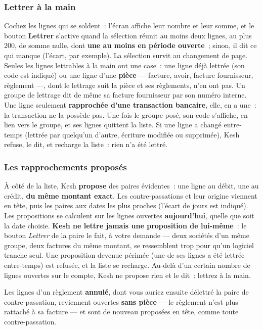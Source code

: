 \documentclass[a4paper,11pt,oneside]{article}
\begin{document}
\subsubsection{Lettrer à la main}

Cochez les lignes qui se soldent~: l'écran affiche leur nombre et leur somme, et le bouton
\textbf{Lettrer} s'active quand la sélection réunit au moins deux lignes, au plus 200, de somme
nulle, dont \textbf{une au moins en période ouverte}~; sinon, il dit ce qui manque (l'écart, par
exemple). La sélection survit au changement de page. Seules les lignes lettrables à la main
ont une case~: une ligne déjà lettrée (son code est indiqué) ou une ligne d'une
\textbf{pièce} --- facture, avoir, facture fournisseur, règlement ---, dont le lettrage suit la
pièce et ses règlements, n'en ont pas. Un groupe de lettrage dit de même sa facture fournisseur par son numéro interne. Une ligne seulement \textbf{rapprochée d'une transaction
bancaire}, elle, en a une~: la transaction ne la possède pas. Une fois le
groupe posé, son code s'affiche, en lien vers le groupe, et ses lignes quittent la liste. Si
une ligne a changé entre-temps (lettrée par quelqu'un d'autre, écriture modifiée ou
supprimée), Kesh refuse, le dit, et recharge la liste~: rien n'a été lettré.

\subsubsection{Les rapprochements proposés}

À côté de la liste, Kesh \textbf{propose} des paires évidentes~: une ligne au débit, une au
crédit, \textbf{du même montant exact}. Les contre-passations et leur origine viennent en tête,
puis les paires aux dates les plus proches (l'écart de jours est indiqué). Les propositions se
calculent sur les lignes ouvertes \textbf{aujourd'hui}, quelle que soit la date choisie.
\textbf{Kesh ne lettre jamais une proposition de lui-même}~: le bouton \emph{Lettrer} de la
paire le fait, à votre demande --- deux sociétés d'un même groupe, deux factures du même
montant, se ressemblent trop pour qu'un logiciel tranche seul. Une proposition devenue
périmée (une de ses lignes a été lettrée entre-temps) est refusée, et la liste se recharge.
Au-delà d'un certain nombre de lignes ouvertes sur le compte, Kesh ne propose rien et le dit~:
lettrez à la main.

Les lignes d'un règlement \textbf{annulé}, dont vous auriez ensuite délettré la paire de
contre-passation, reviennent ouvertes \textbf{sans pièce} --- le règlement n'est plus rattaché
à sa facture --- et sont de nouveau proposées en tête, comme toute contre-passation.
\end{document}
